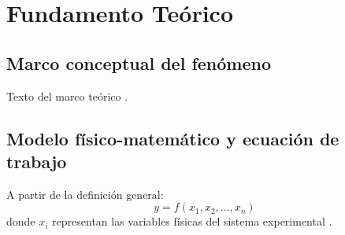 
\section{Fundamento Teórico}
\label{sec:fundamento}

\subsection{Marco conceptual del fenómeno}

Texto del marco teórico \cite{serway}.

\subsection{Modelo físico-matemático y ecuación de trabajo}

A partir de la definición general:
\begin{equation}
    y = f(x_1, x_2, \dots, x_n)
    \label{eq:modelo_general}
\end{equation}
donde $x_i$ representan las variables físicas del sistema experimental \cite{halliday}.